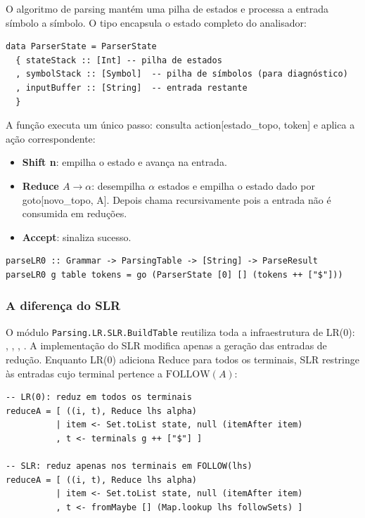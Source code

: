 O algoritmo de parsing mantém uma pilha de estados e processa a
entrada símbolo a símbolo. O tipo
 encapsula o estado completo do analisador:

\begin{verbatim}
data ParserState = ParserState
  { stateStack :: [Int] -- pilha de estados
  , symbolStack :: [Symbol]  -- pilha de símbolos (para diagnóstico)
  , inputBuffer :: [String]  -- entrada restante
  }
\end{verbatim}

A função  executa um único passo:
consulta action[estado\_topo, token] e
aplica a ação correspondente:

\begin{itemize}
  \item
    \textbf{Shift n}: empilha o estado  e
    avança na entrada.
  \item
    \textbf{Reduce $A \to \alpha$}: desempilha $\alpha$
    estados e empilha o estado dado por
    goto[novo\_topo, A]. Depois chama
     recursivamente pois a entrada
    não é consumida em reduções.
  \item
    \textbf{Accept}: sinaliza sucesso.
\end{itemize}

\begin{verbatim}
parseLR0 :: Grammar -> ParsingTable -> [String] -> ParseResult
parseLR0 g table tokens = go (ParserState [0] [] (tokens ++ ["$"]))
\end{verbatim}

\subsubsection{A diferença do SLR}

O módulo \verb|Parsing.LR.SLR.BuildTable|
reutiliza toda a infraestrutura de LR(0):
,
, ,
. A implementação do SLR modifica apenas a geração
das entradas de redução. Enquanto LR(0) adiciona Reduce para todos os
terminais, SLR restringe às entradas cujo terminal pertence a
\(\mathrm{FOLLOW}(A)\):

\begin{verbatim}
-- LR(0): reduz em todos os terminais
reduceA = [ ((i, t), Reduce lhs alpha)
          | item <- Set.toList state, null (itemAfter item)
          , t <- terminals g ++ ["$"] ]

-- SLR: reduz apenas nos terminais em FOLLOW(lhs)
reduceA = [ ((i, t), Reduce lhs alpha)
          | item <- Set.toList state, null (itemAfter item)
          , t <- fromMaybe [] (Map.lookup lhs followSets) ]
\end{verbatim}

